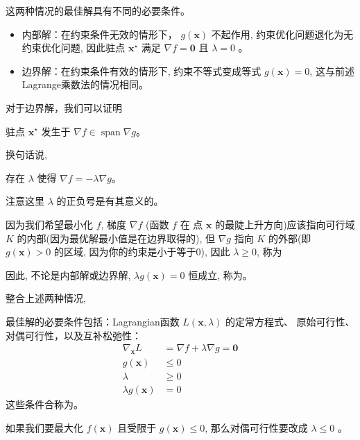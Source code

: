 这两种情况的最佳解具有不同的必要条件。

\begin{itemize}
    \item 内部解：在约束条件无效的情形下， $ g(\mathbf{x}) $ 不起作用, 约束优化问题退化为无约束优化问题, 因此驻点 $ \mathbf{x}^{\star} $ 满足 $ \nabla f=\mathbf{0} $ 且 $ \lambda=0 $ 。
    \item 边界解：在约束条件有效的情形下, 约束不等式变成等式 $g(\mathbf{x})=0$, 这与前述Lagrange乘数法的情况相同。
\end{itemize}

对于边界解，我们可以证明

\begin{theorem}
    驻点 $\mathbf{x}^{\star}$ 发生于 $\nabla f \in \operatorname{span} \nabla g$。
\end{theorem}
换句话说, 

\begin{corollary}
    存在 $\lambda$ 使得 $\nabla f=-\lambda \nabla g$。

    注意这里 $\lambda$ 的正负号是有其意义的。
\end{corollary}

因为我们希望最小化 $f$, 梯度 $\nabla f$ (函数 $f$ 在 点 $\mathbf{x}$ 的最陡上升方向)应该指向可行域 $K$ 的内部(因为最优解最小值是在边界取得的), 但 $\nabla g$ 指向 $K$ 的外部(即 $g(\mathbf{x})>0$ 的区域, 因为你的约束是小于等于0), 因此 $\lambda \geq 0$, 称为

因此, 不论是内部解或边界解, $\lambda g(\mathbf{x})=0$ 恒成立, 称为。

整合上述两种情况, 

\begin{theorem}
    最佳解的必要条件包括：Lagrangian函数 $L(\mathbf{x}, \lambda)$ 的定常方程式、 原始可行性、对偶可行性，以及互补松弛性：
$$
\begin{aligned}
\nabla_{\mathbf{x}} L &=\nabla f+\lambda \nabla g=\mathbf{0} \\
g(\mathbf{x}) & \leq 0 \\
\lambda & \geq 0 \\
\lambda g(\mathbf{x}) &=0
\end{aligned}
$$
这些条件合称为。

如果我们要最大化 $f(\mathbf{x})$ 且受限于 $g(\mathbf{x}) \leq 0$, 那么对偶可行性要改成 $\lambda \leq 0$ 。
\end{theorem}


